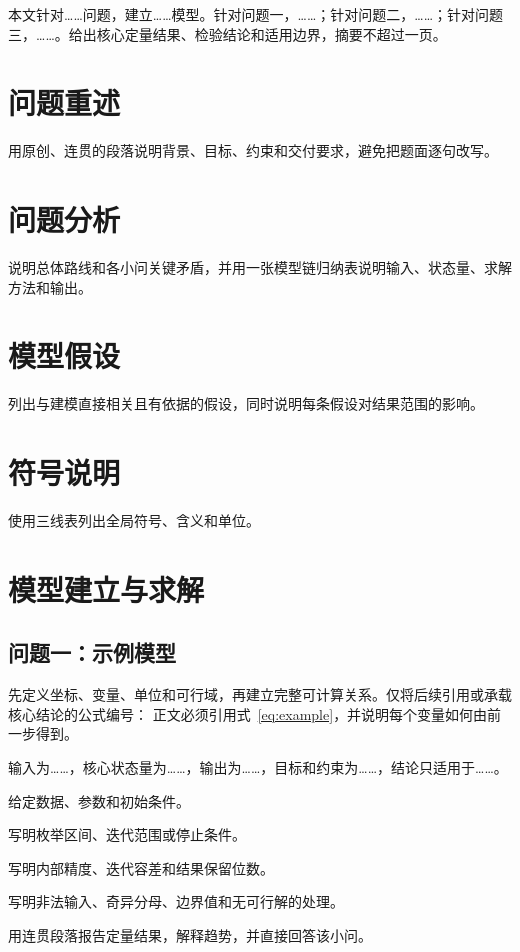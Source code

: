 \documentclass{shumo-cumcm2025}
\begin{document}
\begin{cnabstract}
本文针对……问题，建立……模型。针对问题一，……；针对问题二，……；针对问题三，……。给出核心定量结果、检验结论和适用边界，摘要不超过一页。
\end{cnabstract}
\clearpage
\section{问题重述}
用原创、连贯的段落说明背景、目标、约束和交付要求，避免把题面逐句改写。
\section{问题分析}
说明总体路线和各小问关键矛盾，并用一张模型链归纳表说明输入、状态量、求解方法和输出。
\section{模型假设}
列出与建模直接相关且有依据的假设，同时说明每条假设对结果范围的影响。
\section{符号说明}
使用三线表列出全局符号、含义和单位。
\section{模型建立与求解}
\subsection{问题一：示例模型}
先定义坐标、变量、单位和可行域，再建立完整可计算关系。仅将后续引用或承载核心结论的公式编号：
正文必须引用式~\eqref{eq:example}，并说明每个变量如何由前一步得到。
\begin{modelsummary}[问题一模型归纳]
输入为……，核心状态量为……，输出为……，目标和约束为……，结论只适用于……。
\end{modelsummary}
\begin{solvercontract}[问题一算法求解说明]
\item[输入] 给定数据、参数和初始条件。
\item[搜索区间] 写明枚举区间、迭代范围或停止条件。
\item[精度] 写明内部精度、迭代容差和结果保留位数。
\item[特殊情况] 写明非法输入、奇异分母、边界值和无可行解的处理。
\end{solvercontract}
用连贯段落报告定量结果，解释趋势，并直接回答该小问。
\end{document}

